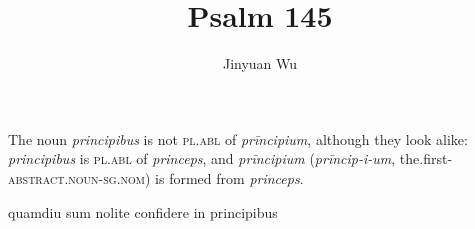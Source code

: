 \documentclass[a4paper, 12pt]{article}
\title{Psalm 145}
\author{Jinyuan Wu}
\newcommand{\form}[1]{\emph{#1}}
\newcommand*{\category}[1]{\textsc{#1}}
\begin{document}
\maketitle

The noun \form{principibus} is not \category{pl.abl} of \form{prīncipium}, 
although they look alike:
\form{principibus} is \category{pl.abl} of \form{princeps},
and \form{prīncipium} (\form{prīncip-i-um}, the.first-\category{abstract.noun}-\category{sg.nom})
is formed from \form{princeps}.

\begin{exe}
    \ex quamdiu sum nolite confidere in principibus
\end{exe}
\end{document}
